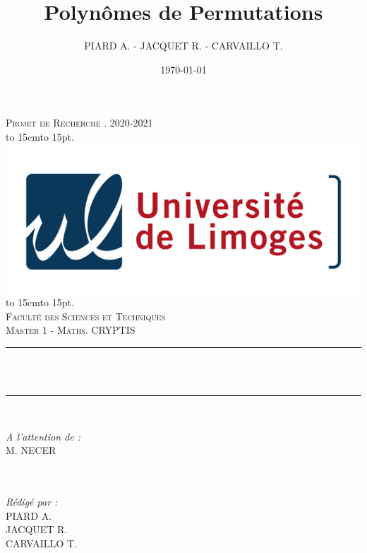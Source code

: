 \documentclass[12pt]{article}
\title{Polynômes de Permutations}
\author{PIARD A. - JACQUET R. - CARVAILLO T.}
\date{\today}
\makeatletter
\let\thetitle\@title
\def\dotfill#1{\cleaders\hbox to #1{.}\hfill}
\newcommand\dotline[2][.5em]{\leavevmode\hbox to #2{\dotfill{#1}\hfil}}
\theoremstyle{definition}
\makeatother
\begin{document}

\begin{titlepage}
	\centering
    \vspace*{0.5 cm}
    \textsc{\LARGE Projet de Recherche . 2020-2021}\\[1.0 cm]
    \dotline[15pt]{15cm}\\
	\includegraphics[scale = 2.2]{logo.png}
	\dotline[15pt]{15cm}\\
	\vspace{1.5cm}
	\textsc{\Large Faculté des Sciences et Techniques}\\
	\textsc{\large Master 1 - Maths. CRYPTIS}\\[1.0 cm]
	\rule{\linewidth}{0.2 mm} \\[0.4 cm]
	{ \huge \bfseries \color{blue} \thetitle}\\
	\rule{\linewidth}{0.2 mm} \\[1.5 cm]
	
	\begin{minipage}{0.4\textwidth}
		\begin{flushleft} \large
			\emph{A l'attention de :}\\
			M. NECER\\
			\phantom{a}\\
			\phantom{a}\\
		\end{flushleft}
	\end{minipage}
	\begin{minipage}{0.5\textwidth}
    	\begin{flushright} \large
		\emph{Rédigé par :}\\
		PIARD A.\\
		JACQUET R.\\
		CARVAILLO T.\\
		\end{flushright}
	\end{minipage}\\[2 cm]
\end{titlepage}
\end{document}
